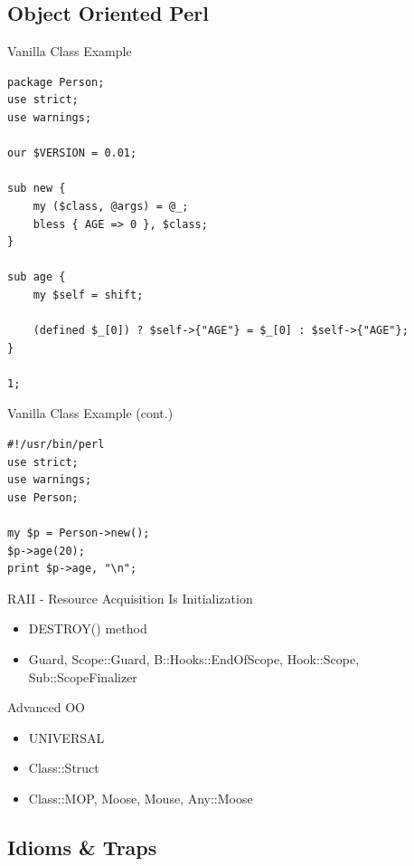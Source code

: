\documentclass{beamer}
\begin{document}
\subsection{Object Oriented Perl}

\begin{frame}[containsverbatim]{Vanilla Class Example}
\begin{lstlisting}[caption=A simple class]
package Person;
use strict;
use warnings;

our $VERSION = 0.01;

sub new {
    my ($class, @args) = @_;
    bless { AGE => 0 }, $class;
}

sub age {
    my $self = shift;

    (defined $_[0]) ? $self->{"AGE"} = $_[0] : $self->{"AGE"};
}

1;
\end{lstlisting}
\end{frame}


\begin{frame}[containsverbatim]{Vanilla Class Example (cont.)}
\begin{lstlisting}[caption=Use class]
#!/usr/bin/perl
use strict;
use warnings;
use Person;

my $p = Person->new();
$p->age(20);
print $p->age, "\n";
\end{lstlisting}
\end{frame}


\begin{frame}{RAII - Resource Acquisition Is Initialization}
  \begin{itemize}
    \item   DESTROY() method
    \item   Guard, Scope::Guard, B::Hooks::EndOfScope,
            Hook::Scope, Sub::ScopeFinalizer
  \end{itemize}
\end{frame}

\begin{frame}{Advanced OO}
  \begin{itemize}
    \item   UNIVERSAL
    \item   Class::Struct
    \item   Class::MOP, Moose, Mouse, Any::Moose
  \end{itemize}
\end{frame}

\subsection{Idioms \& Traps}
\end{document}
